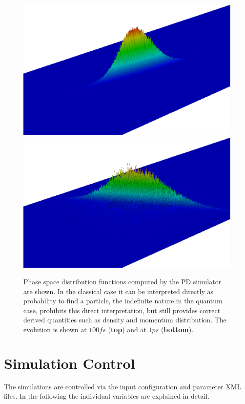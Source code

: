 \begin{figure}[!ht]
  \centering
  \subfigure
  {
  \includegraphics[width=0.5\columnwidth]{figures/wiens_prop1.eps}
  }
  \subfigure
  {
  \includegraphics[width=0.5\columnwidth]{figures/wiens_prop9.eps}
  }
  \caption{
    Phase space distribution functions computed by the PD simulator are shown.
    In the classical case it can be interpreted directly
    as probability to find a particle, the indefinite nature in the
    quantum case, prohibits this direct interpretation, but still
    provides correct derived quantities such as density and momentum
    distribution. The evolution is shown at $100fs$ (\textbf{top})
    and at $1ps$ (\textbf{bottom}).
  }
  \label{fig:one}
\end{figure}

\clearpage

\section{Simulation Control} \label{wigner:sim}

The simulations are controlled via the input configuration and parameter XML files.
In the following the individual variables are explained in detail.




